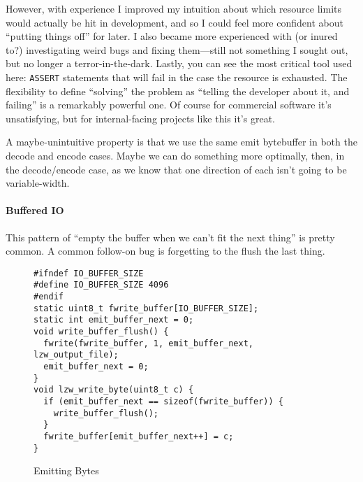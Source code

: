 \documentclass{scrartcl}
\begin{document}
However, with experience I improved my intuition about which resource limits would actually be hit in development, and so I could feel more confident about ``putting things off'' for later.
I also became more experienced with (or inured to?) investigating weird bugs and fixing them---still not something I sought out, but no longer a terror-in-the-dark.
Lastly, you can see the most critical tool used here: \texttt{ASSERT} statements that will fail in the case the resource is exhausted.
The flexibility to define ``solving'' the problem as ``telling the developer about it, and failing'' is a remarkably powerful one.
Of course for commercial software it's unsatisfying, but for internal-facing projects like this it's great.

A maybe-unintuitive property is that we use the same emit bytebuffer in both the decode and encode cases.
Maybe we can do something more optimally, then, in the decode/encode case, as we know that one direction of each isn't going to be variable-width.


\paragraph{Buffered IO}
This pattern of ``empty the buffer when we can't fit the next thing'' is pretty common.
A common follow-on bug is forgetting to the flush the last thing.

\begin{figure}
\begin{verbatim}
#ifndef IO_BUFFER_SIZE
#define IO_BUFFER_SIZE 4096
#endif
static uint8_t fwrite_buffer[IO_BUFFER_SIZE];
static int emit_buffer_next = 0;
void write_buffer_flush() {
  fwrite(fwrite_buffer, 1, emit_buffer_next, lzw_output_file);
  emit_buffer_next = 0;
}
void lzw_write_byte(uint8_t c) {
  if (emit_buffer_next == sizeof(fwrite_buffer)) {
    write_buffer_flush();
  }
  fwrite_buffer[emit_buffer_next++] = c;
}
\end{verbatim}
\caption{Emitting Bytes}
\end{figure}
\end{document}
